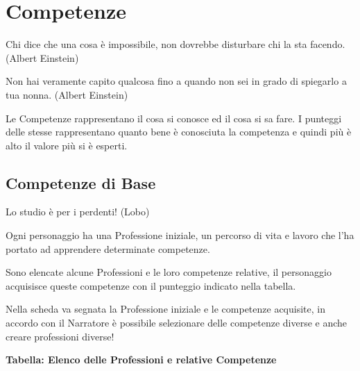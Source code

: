 \section{Competenze}

\begin{enfasi}{
Chi dice che una cosa è impossibile, non dovrebbe disturbare chi la sta facendo. (Albert Einstein)

\medskip
Non hai veramente capito qualcosa fino a quando non sei in grado di spiegarlo a tua nonna. (Albert Einstein)}\end{enfasi}

\begin{multicols}{2}

Le Competenze rappresentano il cosa si conosce ed il cosa si sa fare. I punteggi delle stesse rappresentano quanto bene è conosciuta la competenza e quindi più è alto il valore più si è esperti.

\subsection{Competenze di Base}\label{competenzebase}

\begin{enfasi}{
Lo studio è per i perdenti! (Lobo) }\end{enfasi}


Ogni personaggio ha una Professione iniziale, un percorso di vita e lavoro che l'ha portato ad apprendere determinate competenze.

Sono elencate alcune Professioni e le loro competenze relative, il personaggio acquisisce queste competenze con il punteggio indicato nella tabella.

Nella scheda va segnata la Professione iniziale e le competenze acquisite, in accordo con il Narratore è possibile selezionare delle competenze diverse e anche creare professioni diverse!

\end{multicols}

\textbf{Tabella: Elenco delle Professioni e relative Competenze}

\medskip

